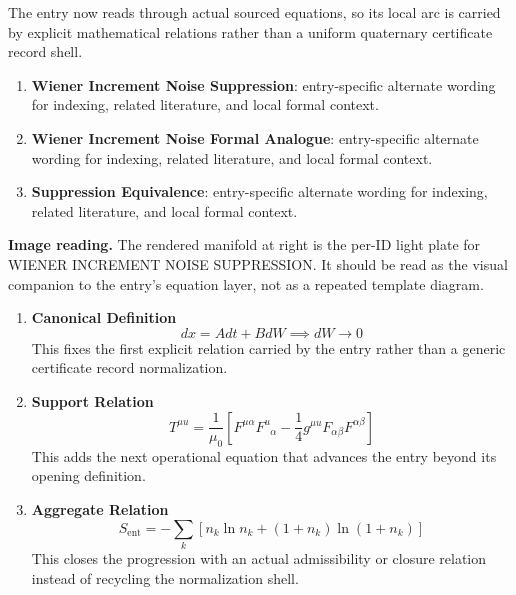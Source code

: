 The entry now reads through actual sourced equations, so its local arc is carried by explicit mathematical relations rather than a uniform quaternary certificate record shell.
\endgroup

\begin{enumerate}[leftmargin=1.6em,itemsep=6pt,topsep=4pt]
\item \textbf{Wiener Increment Noise Suppression}: entry-specific alternate wording for indexing, related literature, and local formal context.
\item \textbf{Wiener Increment Noise Formal Analogue}: entry-specific alternate wording for indexing, related literature, and local formal context.
\item \textbf{Suppression Equivalence}: entry-specific alternate wording for indexing, related literature, and local formal context.
\end{enumerate}

\begin{samepage}
\noindent\begin{minipage}[t]{0.45\linewidth}
\vspace{0pt}
\raggedright
\scriptsize\textbf{Image reading.} The rendered manifold at right is the per-ID light plate for WIENER INCREMENT NOISE SUPPRESSION. It should be read as the visual companion to the entry's equation layer, not as a repeated template diagram.\par
\end{minipage}\hfill
\begin{minipage}[t]{0.53\linewidth}
\vspace*{-0.10in}
\raggedright
{}
\end{minipage}
\end{samepage}

\clearpage


\begin{enumerate}[leftmargin=1.6em,itemsep=9pt,topsep=6pt]
\item \textbf{Canonical Definition}
\[
dx = A dt + B dW \implies dW \to 0
\]
This fixes the first explicit relation carried by the entry rather than a generic certificate record normalization.

\item \textbf{Support Relation}
\[
T^{\mu u} = \frac{1}{\mu_0} \left[ F^{\mu\alpha} F^{ u}_{\phantom{ u}\alpha} - \frac{1}{4} g^{\mu u} F_{\alpha\beta} F^{\alpha\beta} \right]
\]
This adds the next operational equation that advances the entry beyond its opening definition.

\item \textbf{Aggregate Relation}
\[
S_{\mathrm{ent}}
=
-\sum_k\left[n_k\ln n_k+(1+n_k)\ln(1+n_k)\right]
\]
This closes the progression with an actual admissibility or closure relation instead of recycling the normalization shell.
\end{enumerate}

